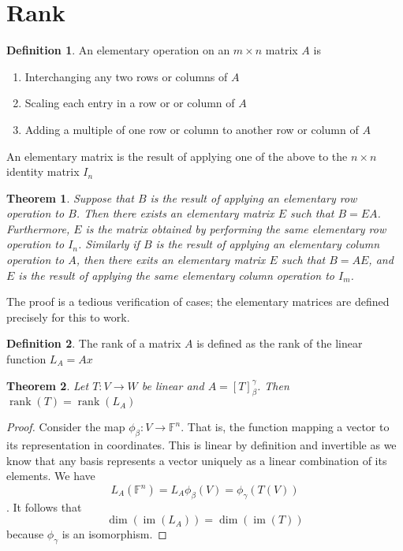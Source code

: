 \documentclass[oneside, 12pt]{book}
\DeclareMathOperator{\rank}{rank}
\DeclareMathOperator{\im}{im}
\newtheorem{thm}{Theorem}[section]
\theoremstyle{definition}
\newtheorem{defn}{Definition}[section]
\begin{document}
\section{Rank}
\begin{defn}
  \label{defn_elmop}
  An elementary operation on an $m \times n$ matrix $A$ is
  \begin{enumerate}
    \item Interchanging any two rows or columns of $A$
    \item Scaling each entry in a row or or column of $A$
    \item Adding a multiple of one row or column to another row or column of $A$
  \end{enumerate}
  An elementary matrix is the result of applying one of the above to the $n \times n$ identity matrix $I_{n}$
\end{defn}
\begin{thm}
  \label{thm_elmop}
  Suppose that $B$ is the result of applying an elementary row operation to $B$. Then there exists an elementary matrix $E$ such that $B=EA$. Furthermore, $E$ is the matrix obtained by performing the same elementary row operation to $I_{n}$. Similarly if $B$ is the result of applying
  an elementary column operation to $A$, then there exits an elementary matrix $E$ such that $B=AE$, and $E$ is the result of applying the same elementary column operation to $I_{m}$.
\end{thm}
The proof is a tedious verification of cases; the elementary matrices are defined precisely for this to work.
\begin{defn}
\label{defn_rnk}
The rank of a matrix $A$ is defined as the rank of the linear function $L_{A}=Ax$
\end{defn}
\begin{thm}
  \label{rnkeq}
  Let $T: V \to W$ be linear and $A=[T]_{\beta}^{\gamma}$. Then $\rank(T)=\rank(L_{A})$
\end{thm}
\begin{proof}
  Consider the map $\phi_{\beta}:V \to \mathbb{F}^{n}$. That is, the function mapping a vector to its representation in coordinates. This is linear by definition and invertible as we know that any basis represents a vector uniquely as a linear combination of its elements. We have
  \[L_{A}(\mathbb{F}^{n})=L_{A}\phi_{\beta}(V)=\phi_{\gamma}(T(V))\]. It follows that \[\dim(\im(L_{A}))=\dim(\im(T))\] because $\phi_{\gamma}$ is an isomorphism.
\end{proof}
\end{document}
